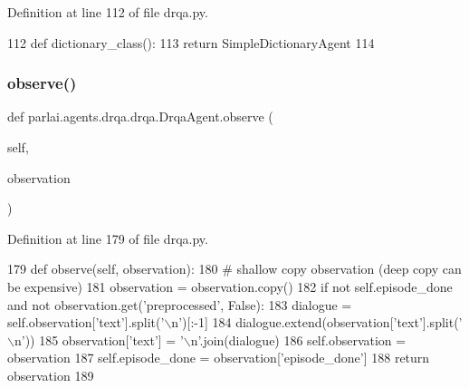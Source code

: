 Definition at line 112 of file drqa.\+py.


\begin{DoxyCode}
112     \textcolor{keyword}{def }dictionary\_class():
113         \textcolor{keywordflow}{return} SimpleDictionaryAgent
114 
\end{DoxyCode}
\mbox{\label{classparlai_1_1agents_1_1drqa_1_1drqa_1_1DrqaAgent_a17be110f5f7cba058238fae60a420507}} 
\subsubsection{\texorpdfstring{observe()}{observe()}}
{\footnotesize\ttfamily def parlai.\+agents.\+drqa.\+drqa.\+Drqa\+Agent.\+observe (\begin{DoxyParamCaption}\item[{}]{self,  }\item[{}]{observation }\end{DoxyParamCaption})}



Definition at line 179 of file drqa.\+py.


\begin{DoxyCode}
179     \textcolor{keyword}{def }observe(self, observation):
180         \textcolor{comment}{# shallow copy observation (deep copy can be expensive)}
181         observation = observation.copy()
182         \textcolor{keywordflow}{if} \textcolor{keywordflow}{not} self.episode\_done \textcolor{keywordflow}{and} \textcolor{keywordflow}{not} observation.get(\textcolor{stringliteral}{'preprocessed'}, \textcolor{keyword}{False}):
183             dialogue = self.observation[\textcolor{stringliteral}{'text'}].split(\textcolor{stringliteral}{'\(\backslash\)n'})[:-1]
184             dialogue.extend(observation[\textcolor{stringliteral}{'text'}].split(\textcolor{stringliteral}{'\(\backslash\)n'}))
185             observation[\textcolor{stringliteral}{'text'}] = \textcolor{stringliteral}{'\(\backslash\)n'}.join(dialogue)
186         self.observation = observation
187         self.episode\_done = observation[\textcolor{stringliteral}{'episode\_done'}]
188         \textcolor{keywordflow}{return} observation
189 
\end{DoxyCode}
\mbox{\label{classparlai_1_1agents_1_1drqa_1_1drqa_1_1DrqaAgent_a654906588f91d21110921ad2ba498c95}} 
